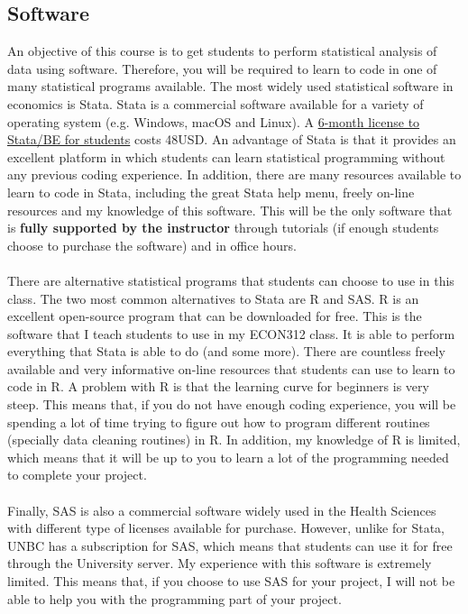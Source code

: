 \documentclass[letterpaper,12pt]{article}
\theoremstyle{dotlessS}
\begin{document}
\subsection*{Software}
An objective of this course is to get students to perform statistical analysis of data using software. Therefore, you will be required to learn to code in one of many statistical programs available. The most widely used statistical software in economics is Stata. Stata is a commercial software available for a variety of operating system (e.g. Windows, macOS and Linux). A  \href{https://www.stata.com/order/new/edu/profplus/student-pricing/}{6-month license to Stata/BE for students} costs 48USD. An advantage of Stata is that it provides an excellent platform in which students can learn statistical programming without any previous coding experience. In addition, there are many resources available to learn to code in Stata, including the great Stata help menu, freely on-line resources and my knowledge of this software. This will be the only software that is \textbf{fully supported by the instructor} through tutorials (if enough students choose to purchase the software) and in office hours.\\
\\
There are alternative statistical programs that students can choose to use in this class. The two most common alternatives to Stata are R and SAS. R is an excellent open-source program that can be downloaded for free. This is the software that I teach students to use in my ECON312 class. It is able to perform everything that Stata is able to do (and some more). There are countless freely available and very informative on-line resources that students can use to learn to code in R. A problem with R is that the learning curve for beginners is very steep. This means that, if you do not have enough coding experience, you will be spending a lot of time trying to figure out how to program different routines (specially data cleaning routines) in R. In addition, my knowledge of R is limited, which means that it will be up to you to learn a lot of the programming needed to complete your project.\\
\\
Finally, SAS is also a commercial software widely used in the Health Sciences with different type of licenses available for purchase. However,  unlike for Stata, UNBC has a subscription for SAS, which means that students can use it for free through the University server. My experience with this software is extremely limited. This means that, if you choose to use SAS for your project, I will not be able to help you with the programming part of your project.      
\end{document}
